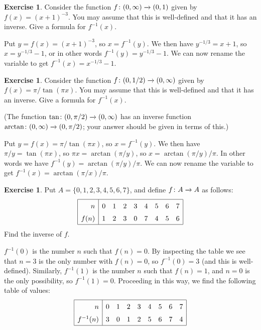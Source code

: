 \documentclass[a4paper]{book}
\theoremstyle{definition}
\newtheorem{exercise}[theorem]{Exercise}
\renewenvironment{solution}{\SolutionInline}{\endSolutionInline}
\begin{document}
\begin{exercise}
 Consider the function $f\colon(0,\infty)\xrightarrow{}(0,1)$ given by
 $f(x)=(x+1)^{-3}$.  You may assume that this is well-defined and that
 it has an inverse.  Give a formula for $f^{-1}(x)$.
\end{exercise}
\begin{solution}
 Put $y=f(x)=(x+1)^{-3}$, so $x=f^{-1}(y)$.  We then have
 $y^{-1/3}=x+1$, so $x=y^{-1/3}-1$, or in other words
 $f^{-1}(y)=y^{-1/3}-1$.  We can now rename the variable to get
 $f^{-1}(x)=x^{-1/3}-1$. 
\end{solution}
\begin{exercise}
 Consider the function $f\colon(0,1/2)\xrightarrow{}(0,\infty)$ given by
 $f(x)=\pi/\tan(\pi x)$.  You may assume that this is well-defined and
 that it has an inverse.  Give a formula for $f^{-1}(x)$.

 (The function $\tan\colon(0,\pi/2)\xrightarrow{}(0,\infty)$ has an inverse
 function $\arctan\colon(0,\infty)\xrightarrow{}(0,\pi/2)$; your answer should be
 given in terms of this.)
\end{exercise}
\begin{solution}
 Put $y=f(x)=\pi/\tan(\pi x)$, so $x=f^{-1}(y)$.  We then have
 $\pi/y=\tan(\pi x)$, so $\pi x=\arctan(\pi/y)$, so
 $x=\arctan(\pi/y)/\pi$.  In other words we have
 $f^{-1}(y)=\arctan(\pi/y)/\pi$.  We can now rename the variable to
 get $f^{-1}(x)=\arctan(\pi/x)/\pi$.
\end{solution} 

\begin{exercise}
 Put $A=\{0,1,2,3,4,5,6,7\}$, and define $f\colon A\xrightarrow{}A$ as follows:
 \[ \renewcommand{\arraystretch}{1.5} \begin{array}{|r|cccccccc|} 
   \hline
   n    & 0 & 1 & 2 & 3 & 4 & 5 & 6 & 7 \\
   f(n) & 1 & 2 & 3 & 0 & 7 & 4 & 5 & 6 \\
   \hline
 \end{array} \]
 Find the inverse of $f$.
\end{exercise}
\begin{solution}
 $f^{-1}(0)$ is the number $n$ such that $f(n)=0$.  By inspecting the
 table we see that $n=3$ is the only number with $f(n)=0$, so
 $f^{-1}(0)=3$ (and this is well-defined).  Similarly, $f^{-1}(1)$ is
 the number $n$ such that $f(n)=1$, and $n=0$ is the only possibility,
 so $f^{-1}(1)=0$.  Proceeding in this way, we find the following
 table of values:
 \[ \renewcommand{\arraystretch}{1.5} \begin{array}{|r|cccccccc|} 
   \hline
   n         & 0 & 1 & 2 & 3 & 4 & 5 & 6 & 7 \\
   f^{-1}(n) & 3 & 0 & 1 & 2 & 5 & 6 & 7 & 4 \\
   \hline
 \end{array} \]
\end{solution}
\end{document}

